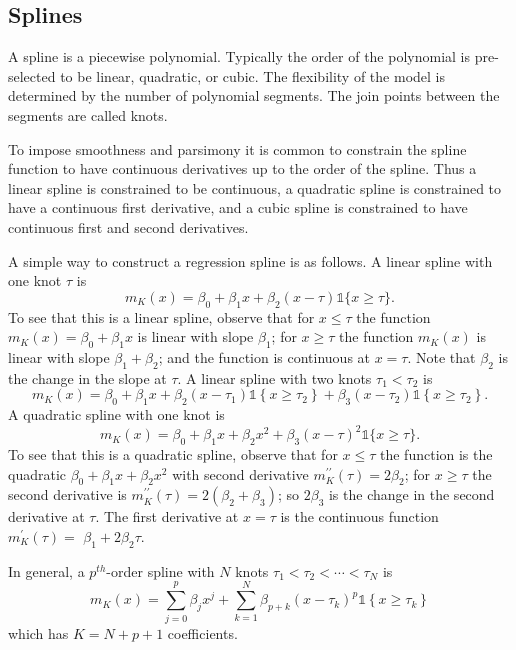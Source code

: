 \documentclass[10pt]{article}
\begin{document}
\subsection{Splines}
A spline is a piecewise polynomial. Typically the order of the polynomial is pre-selected to be linear, quadratic, or cubic. The flexibility of the model is determined by the number of polynomial segments. The join points between the segments are called knots.

To impose smoothness and parsimony it is common to constrain the spline function to have continuous derivatives up to the order of the spline. Thus a linear spline is constrained to be continuous, a quadratic spline is constrained to have a continuous first derivative, and a cubic spline is constrained to have continuous first and second derivatives.

A simple way to construct a regression spline is as follows. A linear spline with one knot $\tau$ is
$$
m_{K}(x)=\beta_{0}+\beta_{1} x+\beta_{2}(x-\tau) \mathbb{1}\{x \geq \tau\} .
$$
To see that this is a linear spline, observe that for $x \leq \tau$ the function $m_{K}(x)=\beta_{0}+\beta_{1} x$ is linear with slope $\beta_{1}$; for $x \geq \tau$ the function $m_{K}(x)$ is linear with slope $\beta_{1}+\beta_{2}$; and the function is continuous at $x=\tau$. Note that $\beta_{2}$ is the change in the slope at $\tau$. A linear spline with two knots $\tau_{1}<\tau_{2}$ is
$$
m_{K}(x)=\beta_{0}+\beta_{1} x+\beta_{2}\left(x-\tau_{1}\right) \mathbb{1}\left\{x \geq \tau_{2}\right\}+\beta_{3}\left(x-\tau_{2}\right) \mathbb{1}\left\{x \geq \tau_{2}\right\} .
$$
A quadratic spline with one knot is
$$
m_{K}(x)=\beta_{0}+\beta_{1} x+\beta_{2} x^{2}+\beta_{3}(x-\tau)^{2} \mathbb{1}\{x \geq \tau\} .
$$
To see that this is a quadratic spline, observe that for $x \leq \tau$ the function is the quadratic $\beta_{0}+\beta_{1} x+\beta_{2} x^{2}$ with second derivative $m_{K}^{\prime \prime}(\tau)=2 \beta_{2}$; for $x \geq \tau$ the second derivative is $m_{K}^{\prime \prime}(\tau)=2\left(\beta_{2}+\beta_{3}\right)$; so $2 \beta_{3}$ is the change in the second derivative at $\tau$. The first derivative at $x=\tau$ is the continuous function $m_{K}^{\prime}(\tau)=$ $\beta_{1}+2 \beta_{2} \tau$.

In general, a $p^{t h}$-order spline with $N$ knots $\tau_{1}<\tau_{2}<\cdots<\tau_{N}$ is
$$
m_{K}(x)=\sum_{j=0}^{p} \beta_{j} x^{j}+\sum_{k=1}^{N} \beta_{p+k}\left(x-\tau_{k}\right)^{p} \mathbb{1}\left\{x \geq \tau_{k}\right\}
$$
which has $K=N+p+1$ coefficients.
\end{document}
